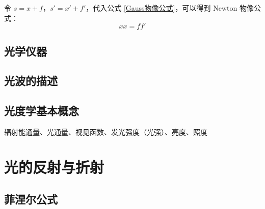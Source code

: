 \documentclass[UTF8]{report}
\theoremstyle{MyLineTheoremStyle} %
\theoremstyle{MyBlockTheoremStyle} %
\theoremstyle{MySubsubsectionStyle} %
\begin{document}
令 $s = x + f$，$s' = x' + f'$，代入公式 \ref{Gauss物像公式}，可以得到 Newton 物像公式：
\begin{equation}
xx = ff'
\end{equation}



\section{光学仪器}
\section{光波的描述}
\section{光度学基本概念}
辐射能通量、光通量、视见函数、发光强度（光强）、亮度、照度

\chapter{光的反射与折射}\thispagestyle{fancy}

\section{菲涅尔公式}
\end{document}
